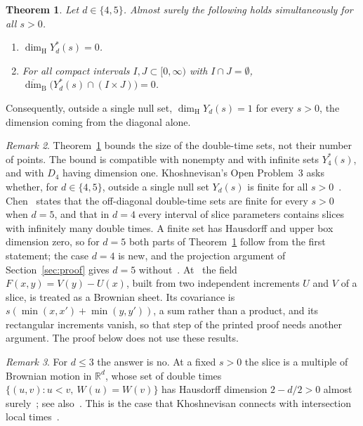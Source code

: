 \documentclass[11pt]{amsart}
\newtheorem{theorem}{Theorem}[section]
\theoremstyle{remark}
\newtheorem{remark}[theorem]{Remark}
\newcommand{\R}{\mathbb{R}}
\newcommand{\dimH}{\dim_{\mathrm H}}
\newcommand{\dimB}{\overline{\dim}_{\mathrm B}}
\begin{document}
\begin{theorem}\label{thm:main}
Let $d\in\{4,5\}$. Almost surely the following holds simultaneously for all $s>0$.
\begin{enumerate}
\item[(a)] $\dimH Y^*_d(s)=0$.
\item[(b)] For all compact intervals $I,J\subset[0,\infty)$ with $I\cap J=\emptyset$,
$\dimB\bigl(Y^*_d(s)\cap(I\times J)\bigr)=0$.
\end{enumerate}
\end{theorem}

Consequently, outside a single null set, $\dimH Y_d(s)=1$ for every $s>0$, the dimension coming from the diagonal alone.

\begin{remark}\label{rem:scope}
Theorem~\ref{thm:main} bounds the size of the double-time sets, not their number of points. The bound is compatible with
nonempty and with infinite sets $Y^*_4(s)$, and with $D_4$ having dimension one. Khoshnevisan's Open Problem~3 asks
whether, for $d\in\{4,5\}$, outside a single null set $Y_d(s)$ is finite for all $s>0$~\cite[Section~8.2]{Kho05}.
Chen~\cite[Theorems~1.3.3 and~1.3.4]{Che26} states that the off-diagonal double-time sets are finite for every $s>0$
when $d=5$, and that in $d=4$ every interval of slice parameters contains slices with infinitely many double times. A
finite set has Hausdorff and upper box dimension zero, so for $d=5$ both parts of Theorem~\ref{thm:main} follow from
the first statement; the case $d=4$ is new, and the projection argument of Section~\ref{sec:proof} gives $d=5$
without~\cite{Che26}. At~\cite[(4.42)]{Che26} the field $F(x,y)=V(y)-U(x)$, built from two independent increments
$U$ and $V$ of a slice, is treated as a Brownian sheet. Its covariance is $s(\min(x,x')+\min(y,y'))$, a sum rather
than a product, and its rectangular increments vanish, so that step of the printed proof needs another argument. The
proof below does not use these results.
\end{remark}

\begin{remark}\label{rem:low}
For $d\le3$ the answer is no. At a fixed $s>0$ the slice is a multiple of Brownian motion in $\R^d$, whose set of double
times $\{(u,v):u<v,\ W(u)=W(v)\}$ has Hausdorff dimension $2-d/2>0$ almost surely~\cite{Ros84}; see
also~\cite[(4.2)]{KWX06}. This is the case that Khoshnevisan connects with intersection local
times~\cite[Section~8.2]{Kho05}.
\end{remark}
\end{document}
